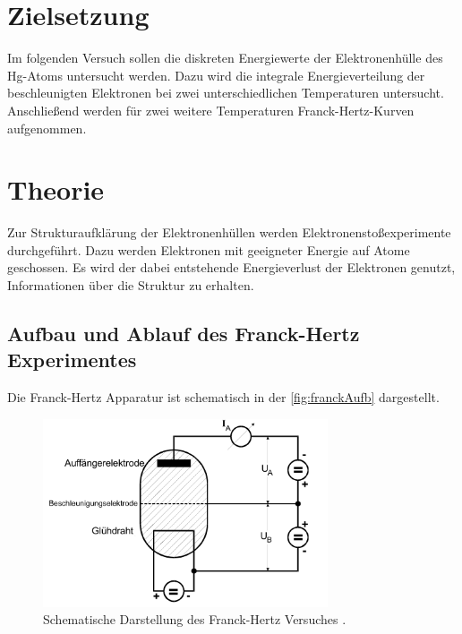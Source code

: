 \section{Zielsetzung}
\label{sec:Ziel}
Im folgenden Versuch sollen die diskreten Energiewerte der Elektronenhülle des Hg-Atoms untersucht werden. Dazu wird die integrale Energieverteilung
der beschleunigten Elektronen bei zwei unterschiedlichen Temperaturen untersucht. Anschließend werden für zwei weitere Temperaturen Franck-Hertz-Kurven aufgenommen.

\section{Theorie}
\label{sec:Theorie}

\noindent
Zur Strukturaufklärung der Elektronenhüllen werden Elektronenstoßexperimente durchgeführt. Dazu werden Elektronen mit geeigneter Energie auf Atome geschossen. Es wird
der dabei entstehende Energieverlust der Elektronen genutzt, Informationen über die Struktur zu erhalten.

\subsection{Aufbau und Ablauf des Franck-Hertz Experimentes}
\label{subsec:aufbau}
Die Franck-Hertz Apparatur ist schematisch in der \autoref{fig:franckAufb} dargestellt.

\begin{figure}[H]
    \centering
    \includegraphics[width=0.75\textwidth]{data/FranckHertz.png}
    \caption{Schematische Darstellung des Franck-Hertz Versuches \cite{Anleitung601}.}
    \label{fig:franckAufb}
\end{figure}

